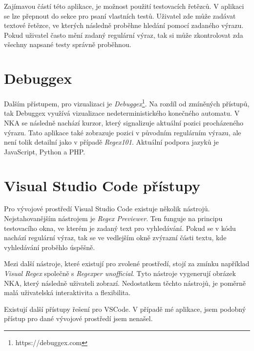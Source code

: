 Zajímavou částí této aplikace, je možnost použití testovacích řetězců.
V aplikaci se lze přepnout do sekce pro psaní vlastních testů.
Uživatel zde může zadávat textové řetězce, ve kterých následně proběhne hledání pomocí zadaného výrazu.
Pokud uživatel často mění zadaný regulární výraz, tak si může zkontrolovat zda všechny napsané testy správně proběhnou.

\section{Debuggex}

Dalším přístupem, pro vizualizaci je \textit{Debuggex}\footnote{https://debuggex.com}.
Na rozdíl od zmíněných přístupů, tak Debuggex využívá vizualizace nedeterministického konečného automatu.
V NKA se následně nachází kurzor, který signalizuje aktuální pozici procházeného výrazu.
Tato aplikace také zobrazuje pozici v původním regulárním výrazu, ale není tolik detailní jako v případě \textit{Regex101}.
Aktuální podpora jazyků je JavaScript, Python a PHP.

\section{Visual Studio Code přístupy}

Pro vývojové prostředí Visual Studio Code existuje několik nástrojů.
Nejstahovanějším nástrojem je \textit{Regex Previewer}.
Ten funguje na principu testovacího okna, ve kterém je zadaný text pro vyhledávání.
Pokud se v kódu nachází regulární výraz, tak se ve vedlejším okně zvýrazní části textu, kde vyhledávání proběhlo úspěšně. 

Mezi další nástroje, které existují pro zvolené prostředí, stojí za zmínku například \textit{Visual Regex} společně s \textit{Regexper unofficial}.
Tyto nástroje vygenerují obrázek NKA, který následně uživateli zobrazí.
Nedostatkem těchto nástrojů, je poměrně malá uživatelská interaktivita a flexibilita.

Existují další přístupy řešení pro VSCode. 
V případě mé aplikace, jsem podobný přístup pro dané vývojové prostředí jsem nenašel.